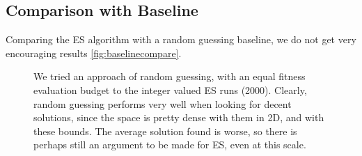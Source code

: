 \subsection{Comparison with Baseline}
Comparing the ES algorithm with a random guessing baseline, we do not get very encouraging results \cref{fig:baselinecompare}.

\begin{figure}[ht]
    \hfill
    \caption{We tried an approach of random guessing, with an equal fitness evaluation budget to the integer valued ES runs (2000). Clearly, random guessing performs very well when looking for decent solutions, since the space is pretty dense with them in 2D, and with these bounds. The average solution found is worse, so there is perhaps still an argument to be made for ES, even at this scale.}
    \label{fig:randomguessingufig} 
\end{figure} 

